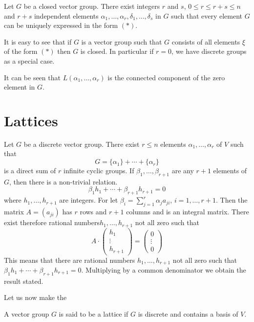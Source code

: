 \begin{thm}\label{chap1:thm2}
Let $G$ be a closed vector group. There exist integers $r$ and $s$,
$0\leq r\leq r+s\leq n$ and $r+s$ independent elements
$\alpha_{1},\ldots,\alpha_{r},\delta_{1},\ldots,\delta_{s}$ in $G$
such that every element $G$ can be uniquely expressed in the form $(\ast)$.
\end{thm}

It is easy to see that if $G$ is a vector group such that $G$ consists
of all elements $\xi$ of the form $(\ast)$ then $G$ is closed. In
particular if $r=0$, we have discrete groups as a special case.

It can be seen that $L(\alpha_{1},\ldots,\alpha_{r})$ is the connected
component of the zero element in $G$.


\section{Lattices}\label{chap1:sec2}

Let $G$ be a discrete vector group. There exist $r\leq n$ elements
$\alpha_{1},\ldots,\alpha_{r}$ of $V$ such that
$$
G=\{\alpha_{1}\}+\cdots+\{\alpha_{r}\}
$$
is a direct sum of $r$ infinite cyclic groups. If
$\beta_{1},\ldots,\beta_{r+1}$ are any $r+1$ elements of $G$, then
there is a non-trivial relation.
$$
\beta_{1}h_{1}+\cdots+\beta_{r+1}h_{r+1}=0
$$
where $h_{1},\ldots,h_{r+1}$ are integers. For let
$\beta_{i}={\displaystyle{\mathop{\sum}_{j=1}^{r}}}\alpha_{j}a_{ji}$,
    $i=1,\ldots,r+1$. Then the matrix $A=(a_{ji})$ has $r$ rows and
    $r+1$ columns and is an integral matrix. There exist therefore
    rational numbers\pageoriginale $h_{1},\ldots,h_{r+1}$ not all zero
    such that
$$
A\cdot
\begin{pmatrix}
h_{1}\\
\vdots\\
h_{r+1}
\end{pmatrix}
=
\begin{pmatrix}
0\\
\vdots\\
0
\end{pmatrix}
$$
This means that there are rational numbers $h_{1},\ldots,h_{r+1}$ not
all zero such that
$\beta_{1}h_{1}+\cdots+\beta_{r+1}h_{r+1}=0$. Multiplying by a common
denominator we obtain the result stated.

Let us now make the

\begin{defi*}
A vector group $G$ is said to be a lattice if $G$ is discrete and
contains a basis of $V$.
\end{defi*}

